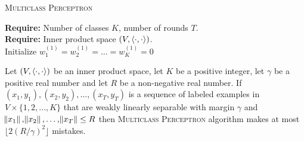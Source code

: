 \begin{algorithm}[h]
\caption{\textsc{Multiclass Perceptron}
\label{algorithm:mutliclass-perceptron}}
\textbf{Require:} Number of classes $K$, number of rounds $T$. \\
\textbf{Require:} Inner product space $(V,\left\langle \cdot, \cdot \right\rangle)$. \\
Initialize $w_1^{(1)} = w_2^{(1)} = \dots = w_K^{(1)} = 0$ \\
\end{algorithm}

\begin{theorem}
\label{theorem:multiclass-perceptron-mistake-upper-bound}
Let $(V, \left\langle \cdot, \cdot \right\rangle)$ be an inner product space, let $K$ be a positive
integer, let $\gamma$ be a positive real number and let $R$ be a non-negative real
number. If $(x_1, y_1), (x_2, y_2), \dots, (x_T, y_T)$ is a sequence of labeled
examples in $V \times \{1,2,\dots,K\}$ that are weakly linearly separable with margin
$\gamma$ and $\norm{x_1}, \norm{x_2}, \dots, \norm{x_T} \le R$
then \textsc{Multiclass Perceptron} algorithm makes at most $\lfloor
2(R/\gamma)^2 \rfloor$ mistakes.
\end{theorem}

